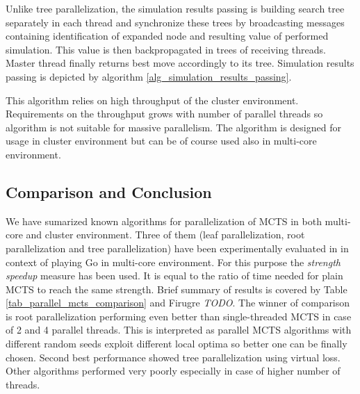 Unlike tree parallelization, the simulation results passing is building search tree separately in
each thread and synchronize these trees by broadcasting messages containing identification of
expanded node and resulting value of performed simulation. This value is then backpropagated in
trees of receiving threads. Master thread finally returns best move accordingly to its tree.
Simulation results passing is depicted by algorithm \ref{alg_simulation_results_passing}.

This algorithm relies on high throughput of the cluster environment. Requirements on the throughput
grows with number of parallel threads so algorithm is not suitable for massive parallelism. The
algorithm is designed for usage in cluster environment but can be of course used also in multi-core
environment.


\subsection{Comparison and Conclusion}

We have sumarized known algorithms for parallelization of MCTS in both multi-core and cluster
environment. Three of them (leaf parallelization, root parallelization and tree
parallelization)
have been experimentally evaluated in \cite{Chaslot2008} in context of playing Go in multi-core
environment. For this purpose the \emph{strength speedup} measure has been used. It is equal to
 the ratio of time needed for plain
MCTS to reach the same strength. Brief summary of results is covered by Table
\ref{tab_parallel_mcts_comparison} and Firugre \emph{TODO}. The winner of comparison is root parallelization performing even
better than single-threaded MCTS in case of 2 and 4 parallel threads. This is interpreted as 
parallel MCTS algorithms with different random seeds exploit different local optima so better one
can be finally chosen. Second best performance showed tree parallelization using virtual loss. Other
algorithms performed very poorly especially in case of higher number of threads.


